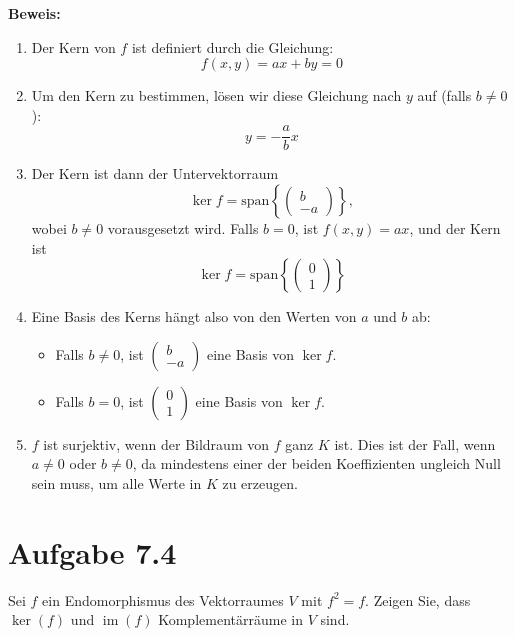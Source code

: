 \documentclass[11pt]{article}
\begin{document}
\textbf{Beweis:}
\begin{enumerate}
    \item Der Kern von \( f \) ist definiert durch die Gleichung:
    \[
    f(x, y) = ax + by = 0
    \]
    \item Um den Kern zu bestimmen, lösen wir diese Gleichung nach \( y \) auf (falls \( b \neq 0 \)):
    \[
    y = -\frac{a}{b}x
    \]
    \item Der Kern ist dann der Untervektorraum
    \[
    \ker f = \text{span}\left\{\begin{pmatrix} b \\ -a \end{pmatrix}\right\},
    \]
    wobei \( b \neq 0 \) vorausgesetzt wird. Falls \( b = 0 \), ist \( f(x, y) = ax \), und der Kern ist
    \[
    \ker f = \text{span}\left\{\begin{pmatrix} 0 \\ 1 \end{pmatrix}\right\}
    \]
    \item Eine Basis des Kerns hängt also von den Werten von \( a \) und \( b \) ab:
    \begin{itemize}
        \item Falls \( b \neq 0 \), ist \( \begin{pmatrix} b \\ -a \end{pmatrix} \) eine Basis von \( \ker f \).
        \item Falls \( b = 0 \), ist \( \begin{pmatrix} 0 \\ 1 \end{pmatrix} \) eine Basis von \( \ker f \).
    \end{itemize}
    \item \( f \) ist surjektiv, wenn der Bildraum von \( f \) ganz \( K \) ist. Dies ist der Fall, wenn \( a \neq 0 \) oder \( b \neq 0 \), da mindestens einer der beiden Koeffizienten ungleich Null sein muss, um alle Werte in \( K \) zu erzeugen.
\end{enumerate}

\section*{Aufgabe 7.4}

Sei \( f \) ein Endomorphismus des Vektorraumes \( V \) mit \( f^2 = f \). Zeigen Sie, dass \( \ker(f) \) und \( \operatorname{im}(f) \) Komplementärräume in \( V \) sind.
\end{document}
